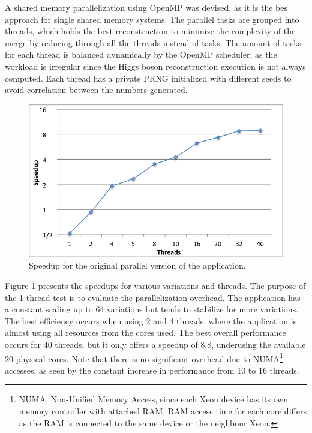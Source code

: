 A shared memory parallelization using OpenMP was devised, as it is the bes approach for single shared memory systems. The parallel tasks are grouped into threads, which holds the best reconstruction to minimize the complexity of the merge by reducing through all the threads instead of tasks. The amount of tasks for each thread is balanced dynamically by the OpenMP scheduler, as the workload is irregular since the Higgs boson reconstruction execution is not always computed. Each thread has a private PRNG initialized with different seeds to avoid correlation between the numbers generated.

\begin{figure}[!htp]
	\begin{center}
		\includegraphics[scale=0.55]{charts/speedup_non_pointer_omp.png}
		\caption{Speedup for the \tth original parallel version of the application.}
		\label{fig:non_pointer_speedup}
	\end{center}
\end{figure}

Figure \ref{fig:non_pointer_speedup} presents the speedups for various variations and threads. The purpose of the 1 thread test is to evaluate the parallelization overhead. The application has a constant scaling up to 64 variations but tends to stabilize for more variations. The best efficiency occurs when using 2 and 4 threads, where the application is almost using all resources from the cores used. The best overall performance occurs for 40 threads, but it only offers a speedup of 8.8, underusing the available 20 physical cores. Note that there is no significant overhead due to NUMA\footnote{NUMA, Non-Unified Memory Access, since each Xeon device has its own memory controller with attached RAM: RAM access time for each core differs as the RAM is connected to the same device or the neighbour Xeon.} accesses, as seen by the constant increase in performance from 10 to 16 threads.

